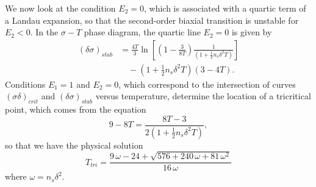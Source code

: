 \documentclass[aps,pre,reprint,amsmath,amssymbols,superscriptaddress,
nofootinbib]{revtex4-1}
\begin{document}
We now look at the condition $E_{2}=0$, which is associated with a quartic
term of a Landau expansion, so that the second-order biaxial transition is
unstable for $E_{2}<0$. In the $\sigma-T$ phase diagram, the quartic line
$E_{2}=0$ is given by%
\begin{align}
\left(  \delta\sigma\right)  _{stab}&=\frac{4T}{3}\ln\left[  \left(  1-\frac
{3}{8T}\right)  \frac{1}{\left(  1+\frac{1}{2}n_{s}\delta^{2}T\right)
}\right]
\nonumber \\ & \quad
-\left(  1+\frac{1}{2}n_{s}\delta^{2}T\right)  \left(  3-4T\right).
\end{align}
Conditions $E_{1}=1$ and $E_{2}=0$, which correspond to the intersection of
curves $\left(  \sigma\delta\right)  _{crit}$ and $\left(  \delta
\sigma\right)  _{stab}$ versus temperature, determine the location of a
tricritical point, which comes from the equation%
\begin{equation}
9-8T=\frac{8T-3}{2\left(  1+\frac{1}{2}n_{s}\delta^{2}T\right)  },
\end{equation}
so that we have the physical solution%
\begin{equation}
T_{tri}=
\frac{9 \, \omega - 24 + \sqrt{576 +240 \, \omega +81 \, \omega^2}}{ 16 \, \omega }
\end{equation}
where $\omega=n_{s}\delta^{2}$.
\end{document}
